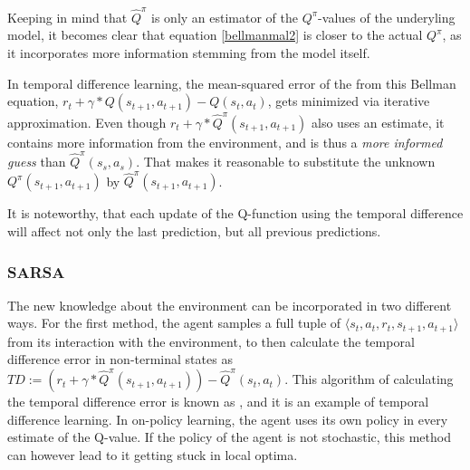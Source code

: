 
Keeping in mind that $\hat{Q}^\pi$ is only an estimator of the $Q^\pi$-values of the underyling model, it becomes clear that equation \ref{bellmanmal2} is closer to the actual $Q^\pi$, as it incorporates more information stemming from the model itself. 

In temporal difference learning, the mean-squared error of the  from this Bellman equation, $r_t + \gamma * Q(s_{t+1},a_{t+1}) - Q(s_t,a_t)$, gets minimized via iterative approximation. Even though $r_t + \gamma * \hat{Q}^\pi(s_{t+1},a_{t+1})$ also uses an estimate, it contains more information from the environment, and is thus a \textit{more informed guess} than $\hat{Q}^\pi(s_s,a_s)$. That makes it reasonable to substitute the unknown $Q^\pi(s_{t+1},a_{t+1})$ by $\hat{Q}^\pi(s_{t+1},a_{t+1})$.

\noindent It is noteworthy, that each update of the Q-function using the temporal difference will affect not only the last prediction, but all previous predictions.



\subsubsection*{\textsc{SARSA}}
The new knowledge about the environment can be incorporated in two different ways. For the first method, the agent samples a full tuple of $\langle s_t, a_t, r_t, s_{t+1}, a_{t+1} \rangle$ from its interaction with the environment, to then calculate the temporal difference error in non-terminal states as $ TD := (r_t + \gamma * \hat{Q}^\pi(s_{t+1}, a_{t+1})) - \hat{Q}^\pi(s_t, a_t)  $. This algorithm of calculating the temporal difference error is known as  , and it is an example of  temporal difference learning. In on-policy learning, the agent uses its own policy in every estimate of the Q-value. If the policy of the agent is not stochastic, this method can however lead to it getting stuck in local optima.

